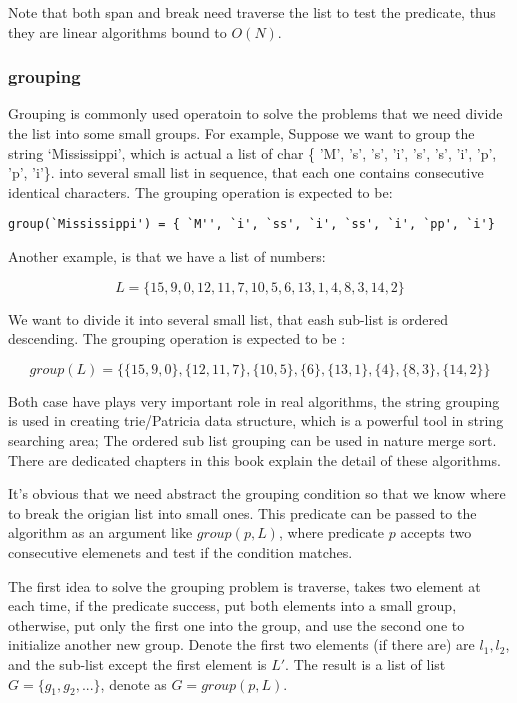 \documentclass{article}
\begin{document}
Note that both span and break need traverse the list to test the predicate, thus they are linear
algorithms bound to $O(N)$.

\subsubsection{grouping}
Grouping is commonly used operatoin to solve the problems that we need divide the list into some small groups.
For example, Suppose we want to group the 
string `Mississippi', which is actual a list of char \{ 'M', 's', 's', 'i', 's', 's', 'i', 'p', 'p', 'i'\}.
into several small list in sequence, that each one contains consecutive identical characters. The grouping
operation is expected to be: 

\begin{verbatim}
group(`Mississippi') = { `M'', `i', `ss', `i', `ss', `i', `pp', `i'}
\end{verbatim}

Another example, is that we have a list of numbers:

\[
L = \{15, 9, 0, 12, 11, 7, 10, 5, 6, 13, 1, 4, 8, 3, 14, 2\}
\]

We want to divide it into several small list, that eash sub-list is ordered descending.
The grouping operation is expected to be :

\[
group(L) = \{ \{15, 9, 0\}, \{12, 11, 7\}, \{10, 5\}, \{6\}, \{13, 1\}, \{4\}, \{8, 3\}, \{14, 2\}\}
\]

Both case have plays very important role in real algorithms, the string grouping is used in creating trie/Patricia
data structure, which is a powerful tool in string searching area; The ordered sub list grouping can be used in
nature merge sort. There are dedicated chapters in this book explain the detail of these algorithms.

It's obvious that we need abstract the grouping condition so that we know where to break the origian list into
small ones. This predicate can be passed to the algorithm as an argument like $group(p, L)$, where predicate
$p$ accepts two consecutive elemenets and test if the condition matches.

The first idea to solve the grouping problem is traverse, takes two element at each time, if the predicate
success, put both elements into a small group, otherwise, put only the first one into the group, and use the second
one to initialize another new group. Denote the first two elements (if there are) are $l_1, l_2$, and the 
sub-list except the first element is $L'$. The result is a list of list $G = \{g_1, g_2, ...\}$, denote as $G = group(p, L)$.
\end{document}
